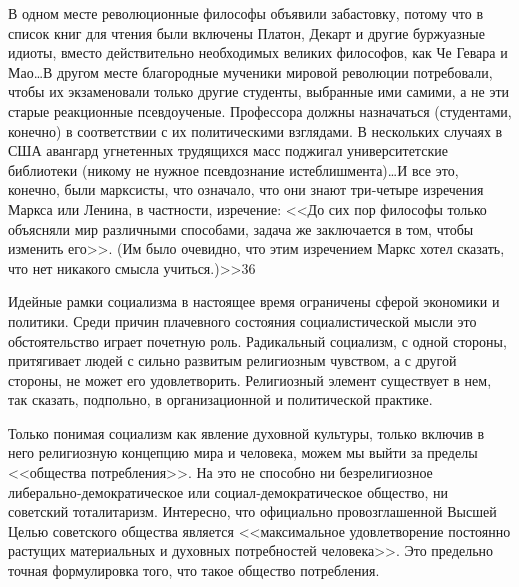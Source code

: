 \documentclass{book}
\begin{document}
{В одном месте революционные философы объявили заба­стовку, потому что в список книг для чтения были включены Платон, Декарт и другие буржуазные идиоты, вместо действи­тельно необходимых великих философов, как Че Гевара и Мао\ldots В другом месте благородные мученики мировой революции по­требовали, чтобы их экзаменовали только другие студенты, вы­бранные ими самими, а не эти старые реакционные псевдо­ученые. Профессора должны назначаться (студентами, конеч­но) в соответствии с их политическими взглядами. В несколь­ких случаях в США авангард угнетенных трудящихся масс поджигал университетские библиотеки (никому не нужное псевдознание истеблишмента)\ldots И все это, конечно, были марк­систы, что означало, что они знают три‑четыре изречения Маркса или Ленина, в частности, изречение: <<До сих пор философы только объясняли мир различными способами, задача же заклю­чается в том, чтобы изменить его>>. (Им было очевидно, что этим изречением Маркс хотел сказать, что нет никакого смысла учиться.)>>36

Идейные рамки социализма в настоящее время ограничены сферой экономики и политики. Среди причин плачевного состояния социалистической мысли это обстоятельство играет почетную роль. Радикальный социализм, с одной стороны, притягивает людей с сильно развитым религиозным чувством, а с другой стороны, не может его удовлетворить. Религиозный элемент существует в нем, так сказать, подпольно, в организационной и политической практике.

Только понимая социализм как явление духовной культуры, только включив в него религиозную концепцию мира и человека, можем мы выйти за пределы <<общества потребления>>. На это не способно ни безрелигиозное либерально‑демократическое или социал‑демократическое общество, ни советский тоталитаризм. Интересно, что официально провозглашенной Высшей Целью советского общества является <<максимальное удовлетворение постоянно растущих материальных и духовных потребностей человека>>. Это предельно точная формулировка того, что такое общество потребления.

}
\end{document}
